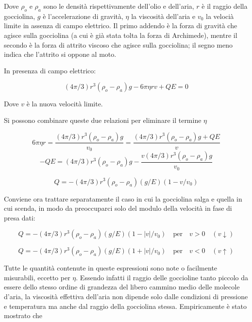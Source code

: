 \documentclass{article}
\begin{document}
Dove $\rho _o$ e $\rho _a$ sono le densità rispettivamente dell'olio e dell'aria, $r$ è il raggio della gocciolina, $g$ è l'accelerazione di gravità, $\eta$ la viscosità dell'aria e $v_0$ la velocià limite in assenza di campo elettrico. Il primo addendo è la forza di gravità che agisce sulla gocciolina (a cui è già stata tolta la forza di Archimede), mentre il secondo è la forza di attrito viscoso che agisce sulla gocciolina; il segno meno indica che l'attrito si oppone al moto.

In presenza di campo elettrico:

\begin{equation}
(4 \pi /3)r^3 (\rho _o - \rho _a)g - 6\pi \eta r v + QE=0 
\end{equation}

Dove $v$ è la nuova velocità limite.

Si possono combinare queste due relazioni per eliminare il termine $\eta$ 

\[6\pi \eta r=\frac{(4 \pi /3)r^3 (\rho _o - \rho _a)g}{v_0}=\frac{(4 \pi /3)r^3 (\rho _o - \rho _a)g + QE}{v}\]
\[-QE=(4 \pi /3)r^3(\rho _o - \rho _a)g - \frac{v(4 \pi /3)r^3(\rho _o - \rho _a)g}{v_0}\]

\begin{equation}
Q=-(4 \pi /3)r^3(\rho _o - \rho _a)(g/E)(1-v/v_0)
\end{equation}

Conviene ora trattare separatamente il caso in cui la gocciolina salga e quella in cui scenda, in modo da preoccuparci solo del modulo della velocità in fase di presa dati:

\begin{equation}
Q=-(4 \pi /3)r^3(\rho _o - \rho _a)(g/E)(1 - |v|/v_0) \quad \textrm{per} \quad v>0 \quad (v \downarrow)
\end{equation}

\begin{equation}
Q=-(4 \pi /3)r^3(\rho _o - \rho _a)(g/E)(1+|v|/v_0) \quad \textrm{per} \quad v<0 \quad (v \uparrow)
\end{equation}

Tutte le quantità contenute in queste espressioni sono note o facilmente misurabili, eccetto per $\eta$. Essendo infatti il raggio delle goccioline tanto piccolo da essere dello stesso ordine di grandezza del libero cammino medio delle molecole d'aria, la viscosità effettiva dell'aria non dipende solo dalle condizioni di pressione e temperatura ma anche dal raggio della gocciolina stessa. Empiricamente è stato mostrato che 
\end{document}
